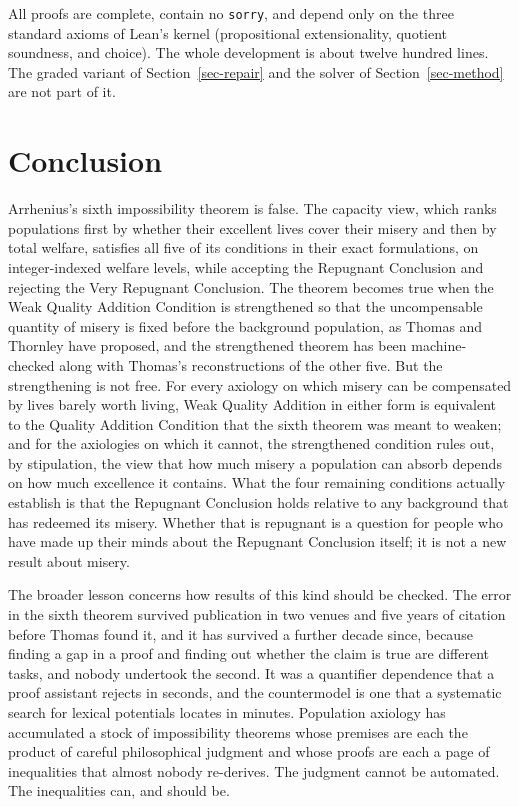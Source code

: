 \documentclass[
  11pt,
  letterpaper,
  DIV=11,
  numbers=noendperiod,
  twoside]{scrartcl}
\begin{document}
All proofs are complete, contain no \texttt{sorry}, and depend only on
the three standard axioms of Lean's kernel (propositional
extensionality, quotient soundness, and choice). The whole development
is about twelve hundred lines. The graded variant of
Section~\ref{sec-repair} and the solver of Section~\ref{sec-method} are
not part of it.

\section{Conclusion}\label{sec-conclusion}

Arrhenius's sixth impossibility theorem is false. The capacity view,
which ranks populations first by whether their excellent lives cover
their misery and then by total welfare, satisfies all five of its
conditions in their exact formulations, on integer-indexed welfare
levels, while accepting the Repugnant Conclusion and rejecting the Very
Repugnant Conclusion. The theorem becomes true when the Weak Quality
Addition Condition is strengthened so that the uncompensable quantity of
misery is fixed before the background population, as Thomas and Thornley
have proposed, and the strengthened theorem has been machine-checked
along with Thomas's reconstructions of the other five. But the
strengthening is not free. For every axiology on which misery can be
compensated by lives barely worth living, Weak Quality Addition in
either form is equivalent to the Quality Addition Condition that the
sixth theorem was meant to weaken; and for the axiologies on which it
cannot, the strengthened condition rules out, by stipulation, the view
that how much misery a population can absorb depends on how much
excellence it contains. What the four remaining conditions actually
establish is that the Repugnant Conclusion holds relative to any
background that has redeemed its misery. Whether that is repugnant is a
question for people who have made up their minds about the Repugnant
Conclusion itself; it is not a new result about misery.

The broader lesson concerns how results of this kind should be checked.
The error in the sixth theorem survived publication in two venues and
five years of citation before Thomas found it, and it has survived a
further decade since, because finding a gap in a proof and finding out
whether the claim is true are different tasks, and nobody undertook the
second. It was a quantifier dependence that a proof assistant rejects in
seconds, and the countermodel is one that a systematic search for
lexical potentials locates in minutes. Population axiology has
accumulated a stock of impossibility theorems whose premises are each
the product of careful philosophical judgment and whose proofs are each
a page of inequalities that almost nobody re-derives. The judgment
cannot be automated. The inequalities can, and should be.
\end{document}
